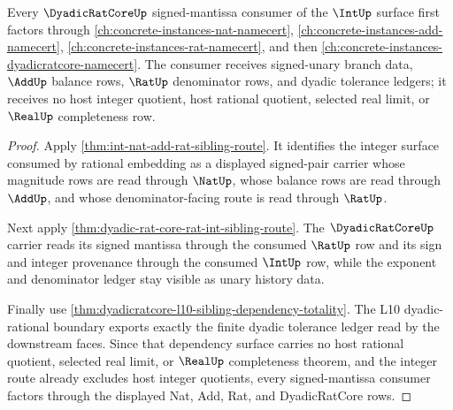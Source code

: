 \begin{theorem}
\label{thm:int-nat-add-rat-dyadic-lattice-readback}
Every $\DyadicRatCoreUp$ signed-mantissa consumer of the $\IntUp$ surface first
factors through \autoref{ch:concrete-instances-nat-namecert},
\autoref{ch:concrete-instances-add-namecert},
\autoref{ch:concrete-instances-rat-namecert}, and then
\autoref{ch:concrete-instances-dyadicratcore-namecert}. The consumer receives
signed-unary branch data, $\AddUp$ balance rows, $\RatUp$ denominator rows, and
dyadic tolerance ledgers; it receives no host integer quotient, host rational
quotient, selected real limit, or $\RealUp$ completeness row.
\end{theorem}
\begin{proof}
Apply \autoref{thm:int-nat-add-rat-sibling-route}. It identifies the integer
surface consumed by rational embedding as a displayed signed-pair carrier whose
magnitude rows are read through $\NatUp$, whose balance rows are read through
$\AddUp$, and whose denominator-facing route is read through $\RatUp$.

Next apply \autoref{thm:dyadic-rat-core-rat-int-sibling-route}. The
$\DyadicRatCoreUp$ carrier reads its signed mantissa through the consumed
$\RatUp$ row and its sign and integer provenance through the consumed
$\IntUp$ row, while the exponent and denominator ledger stay visible as unary
history data.

Finally use \autoref{thm:dyadicratcore-l10-sibling-dependency-totality}. The
L10 dyadic-rational boundary exports exactly the finite dyadic tolerance ledger
read by the downstream faces. Since that dependency surface carries no host
rational quotient, selected real limit, or $\RealUp$ completeness theorem, and
the integer route already excludes host integer quotients, every
signed-mantissa consumer factors through the displayed Nat, Add, Rat, and
DyadicRatCore rows.
\end{proof}
